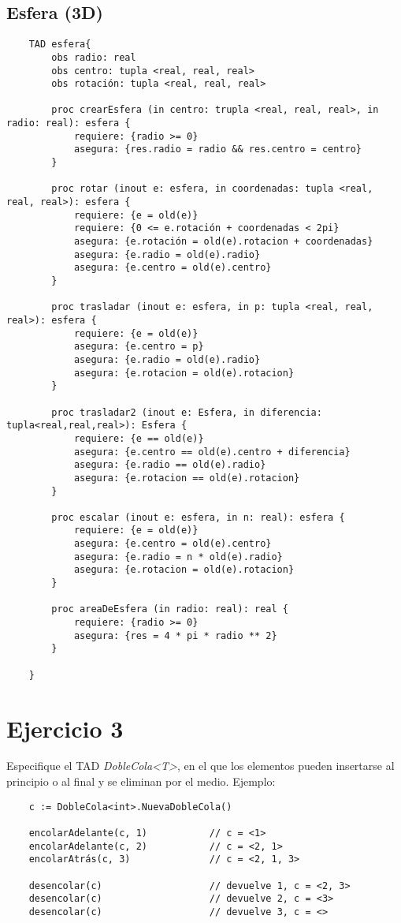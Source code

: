 \documentclass[10pt,a4paper]{article}
\begin{document}
\subsection{Esfera (3D)}
\begin{lstlisting}
    TAD esfera{
        obs radio: real
        obs centro: tupla <real, real, real>
        obs rotación: tupla <real, real, real>

        proc crearEsfera (in centro: trupla <real, real, real>, in radio: real): esfera {
            requiere: {radio >= 0}
            asegura: {res.radio = radio && res.centro = centro}
        }

        proc rotar (inout e: esfera, in coordenadas: tupla <real, real, real>): esfera {
            requiere: {e = old(e)}
            requiere: {0 <= e.rotación + coordenadas < 2pi}
            asegura: {e.rotación = old(e).rotacion + coordenadas}
            asegura: {e.radio = old(e).radio}
            asegura: {e.centro = old(e).centro}
        }

        proc trasladar (inout e: esfera, in p: tupla <real, real, real>): esfera {
            requiere: {e = old(e)}
            asegura: {e.centro = p}
            asegura: {e.radio = old(e).radio}
            asegura: {e.rotacion = old(e).rotacion}
        }

        proc trasladar2 (inout e: Esfera, in diferencia: tupla<real,real,real>): Esfera {
            requiere: {e == old(e)}
            asegura: {e.centro == old(e).centro + diferencia}
            asegura: {e.radio == old(e).radio}
            asegura: {e.rotacion == old(e).rotacion}
        }

        proc escalar (inout e: esfera, in n: real): esfera {
            requiere: {e = old(e)}
            asegura: {e.centro = old(e).centro}
            asegura: {e.radio = n * old(e).radio}
            asegura: {e.rotacion = old(e).rotacion}
        }

        proc areaDeEsfera (in radio: real): real {
            requiere: {radio >= 0}
            asegura: {res = 4 * pi * radio ** 2}
        }

    }
\end{lstlisting}

\section{Ejercicio 3}
Especifique el TAD \textit{DobleCola<T>}, en el que los elementos pueden insertarse al principio o al final y se eliminan por el medio. Ejemplo:
\begin{lstlisting}
    c := DobleCola<int>.NuevaDobleCola()

    encolarAdelante(c, 1)           // c = <1>
    encolarAdelante(c, 2)           // c = <2, 1>
    encolarAtrás(c, 3)              // c = <2, 1, 3>
    
    desencolar(c)                   // devuelve 1, c = <2, 3>
    desencolar(c)                   // devuelve 2, c = <3>
    desencolar(c)                   // devuelve 3, c = <>
\end{lstlisting}
\end{document}
